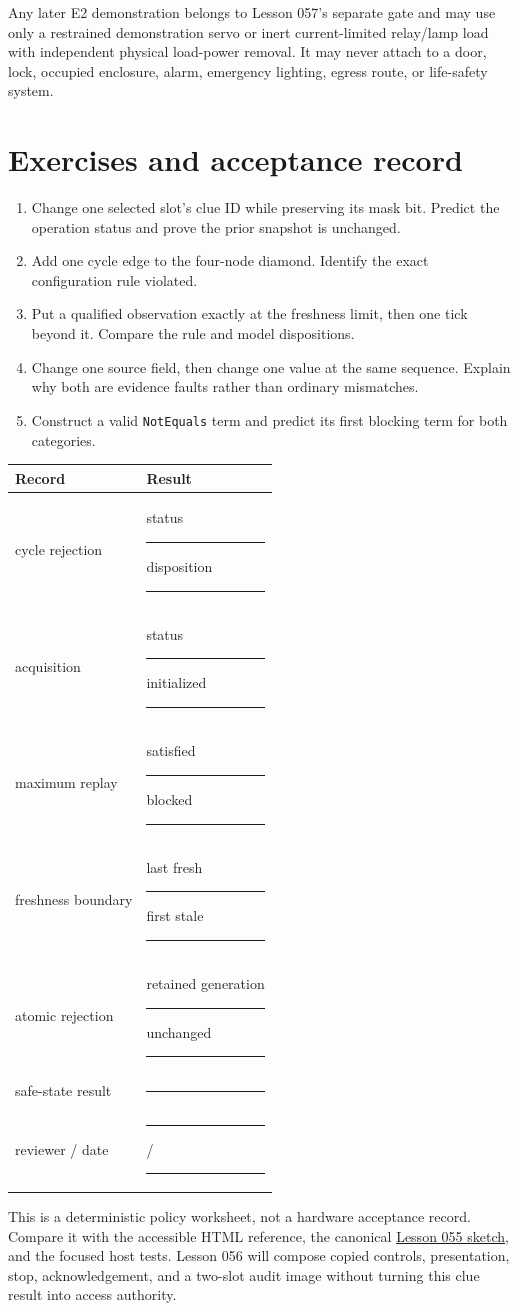 \documentclass[10pt]{article}
\newcommand{\blankline}{\rule{0.72in}{0.4pt}}
\newcommand{\longblank}{\rule{1.25in}{0.4pt}}
\begin{document}
Any later E2 demonstration belongs to Lesson 057's separate gate and may use
only a restrained demonstration servo or inert current-limited relay/lamp
load with independent physical load-power removal. It may never attach to a
door, lock, occupied enclosure, alarm, emergency lighting, egress route, or
life-safety system.

\section{Exercises and acceptance record}
\begin{enumerate}
 \item Change one selected slot's clue ID while preserving its mask bit.
       Predict the operation status and prove the prior snapshot is unchanged.
 \item Add one cycle edge to the four-node diamond. Identify the exact
       configuration rule violated.
 \item Put a qualified observation exactly at the freshness limit, then one
       tick beyond it. Compare the rule and model dispositions.
 \item Change one source field, then change one value at the same sequence.
       Explain why both are evidence faults rather than ordinary mismatches.
 \item Construct a valid \texttt{NotEquals} term and predict its first
       blocking term for both categories.
\end{enumerate}

\begin{tabularx}{\linewidth}{@{}l X@{}}
\toprule
Record & Result\\
\midrule
cycle rejection & status \blankline\quad disposition \longblank\\
acquisition & status \blankline\quad initialized \blankline\\
maximum replay & satisfied \blankline\quad blocked \blankline\\
freshness boundary & last fresh \blankline\quad first stale \blankline\\
atomic rejection & retained generation \blankline\quad unchanged \blankline\\
safe-state result & \rule{4.5in}{0.4pt}\\
reviewer / date & \longblank\quad / \quad\longblank\\
\bottomrule
\end{tabularx}

This is a deterministic policy worksheet, not a hardware acceptance record.
Compare it with the accessible HTML reference, the canonical
\href{https://github.com/spincyc/adk/tree/main/examples/Lesson055ClueConstraintModel}
{Lesson 055 sketch}, and the focused host tests. Lesson 056 will compose
copied controls, presentation, stop, acknowledgement, and a two-slot audit
image without turning this clue result into access authority.
\end{document}
